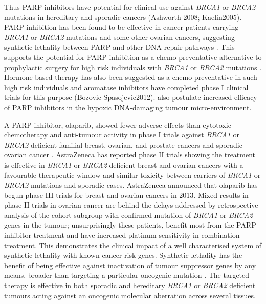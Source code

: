Thus PARP inhibitors have potential for clinical use against \textit{BRCA1} or \textit{BRCA2} mutations in hereditary and sporadic cancers (Ashworth 2008; Kaelin2005). PARP inhibition has been found to be effective in cancer patients carrying \textit{BRCA1} or \textit{BRCA2} mutations and some other ovarian cancers, suggesting synthetic lethality between PARP and other DNA repair pathways \citep{Strom2012}. This supports the potential for PARP inhibition as a chemo-preventative alternative to prophylactic surgery for high risk individuals with \textit{BRCA1} or \textit{BRCA2} mutations \citep{Strom2012}. Hormone-based therapy has also been suggested as a chemo-preventative in such high risk individuals and aromatase inhibitors have completed phase I clinical trials for this purpose (Bozovic-Spasojevic2012). \citet{Strom2012} also postulate increased efficacy of PARP inhibitors in the hypoxic DNA-damaging tumour micro-environment.  

A PARP inhibitor, olaparib, showed fewer adverse effects than cytotoxic chemotherapy and anti-tumour activity in phase I trials against \textit{BRCA1} or \textit{BRCA2} deficient familial breast, ovarian, and prostate cancers \citep{Fong2009} and sporadic ovarian cancer \citep{Fong2010}. AstraZeneca has reported phase II trials showing the treatment is effective in \textit{BRCA1} or \textit{BRCA2} deficient breast \citep{Tutt2010} and ovarian cancers \citep{Audeh2010} with a favourable therapeutic window and similar toxicity between carriers of \textit{BRCA1} or \textit{BRCA2} mutations and sporadic cases. AstraZeneca announced that olaparib has begun phase III trials for breast and ovarian cancers in 2013. Mixed results in phase II trials in ovarian cancer are behind the delays addressed by retrospective analysis of the cohort subgroup with confirmed mutation of \textit{BRCA1} or \textit{BRCA2} genes in the tumour; unsurprisingly these patients, benefit most from the PARP inhibitor treatment and have increased platinum sensitivity in combination treatment. This demonstrates the clinical impact of a well characterised system of synthetic lethality with known cancer risk genes. Synthetic lethality has the benefit of being effective against inactivation of tumour suppressor genes by any means, broader than targeting a particular oncogenic mutation \citep{Kaelin2005}. The targeted therapy is effective in both sporadic and hereditary \textit{BRCA1} or \textit{BRCA2} deficient tumours acting against an oncogenic molecular aberration across several tissues.  

